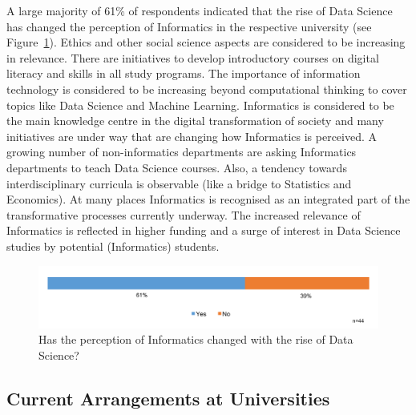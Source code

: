 A large majority of 61\% of respondents indicated that the rise of Data Science has changed the perception of Informatics in the respective university (see Figure~\ref{sect4:}). Ethics and other social science aspects are considered to be increasing in relevance. There are initiatives to develop introductory courses on digital literacy and skills in all study programs. The importance of information technology is considered to be increasing beyond computational thinking to cover topics like Data Science and Machine Learning. Informatics is considered to be the main knowledge centre in the digital transformation of society and many initiatives are under way that are changing how Informatics is perceived. A growing number of non-informatics departments are asking Informatics departments to teach Data Science courses. Also, a tendency towards interdisciplinary curricula is observable (like a bridge to Statistics and Economics). At many places Informatics is recognised as an integrated part of the transformative processes currently underway. The increased relevance of Informatics is reflected in higher funding and a surge of interest in Data Science studies by potential (Informatics) students.

\begin{figure}[h]
\centering
\includegraphics[width = \linewidth]{charts/4b.png}
\caption{Has the perception of Informatics changed with the rise of Data Science?}
\label{sect4:}
\end{figure}

\subsection{Current Arrangements at Universities}

